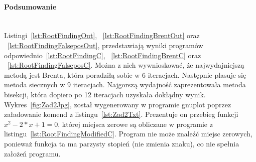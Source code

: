 \paragraph{Podsumowanie}~\\
Listingi~\ref{lst:RootFindingOut}, ~\ref{lst:RootFindingBrentOut} oraz ~\ref{lst:RootFindingFalseposOut}, przedstawiają wyniki programów odpowiednio~\ref{lst:RootFindingC}, ~\ref{lst:RootFindingBrentC} oraz ~\ref{lst:RootFindingFalseposC}.
Można z nich wywnioskować, że najwydajniejszą metodą jest Brenta, która poradziłą sobie w 6 iteracjach.
Następnie plasuje się metoda siecznych w 9 iteracjach.
Najgorszą wydajność zaprezentowała metoda bisekcji, która dopiero po 12 iteracjach uzyskała dokłądny wynik.\\
Wykres~\ref{fig:Zad2Jpg}, został wygenerowany w programie gnuplot poprzez załadowanie komend z listingu~\ref{lst:Zad2Txt}.
Prezentuje on przebieg funkcji $ x^2 - 2*x + 1 = 0 $, której miejsca zerowe są obliczane w programie z listingu~\ref{lst:RootFindingModifiedC}.
Program nie może znaleźć miejsc zerowych, ponieważ funkcja ta ma parzysty stopień (nie zmienia znaku), co nie spełnia założeń programu.
